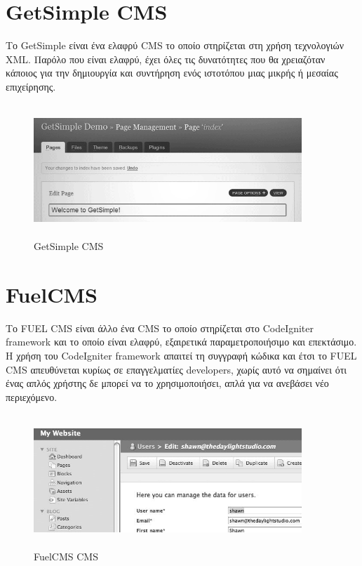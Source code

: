 \documentclass[12pt]{report}
\begin{document}
\section{\textlatin{GetSimple CMS}}
Το \textlatin{GetSimple} είναι ένα ελαφρύ \textlatin{CMS} το οποίο στηρίζεται στη χρήση τεχνολογιών \textlatin{XML}. Παρόλο που είναι ελαφρύ, έχει όλες τις δυνατότητες που θα χρειαζόταν κάποιος για την δημιουργία και συντήρηση ενός ιστοτόπου μιας μικρής ή μεσαίας επιχείρησης.
\begin{figure}[H]
\centering
\includegraphics[width=0.9\textwidth, height=5cm]{getsimplecms-gray}
\caption{\textlatin{GetSimple CMS}}
\label{fig:get_simpl}
\end{figure}

\section{\textlatin{FuelCMS}}
Το \textlatin{FUEL CMS} είναι άλλο ένα \textlatin{CMS} το οποίο στηρίζεται στο \textlatin{CodeIgniter framework} και το οποίο είναι ελαφρύ, εξαιρετικά παραμετροποιήσιμο και επεκτάσιμο. Η χρήση του \textlatin{CodeIgniter framework} απαιτεί τη συγγραφή κώδικα και έτσι το \textlatin{FUEL CMS} απευθύνεται κυρίως σε επαγγελματίες \textlatin{developers}, χωρίς αυτό να σημαίνει ότι ένας απλός χρήστης δε μπορεί να το χρησιμοποιήσει, απλά για να ανεβάσει νέο περιεχόμενο.
\begin{figure}[H]
\centering
\includegraphics[width=0.9\textwidth, height=5cm]{fuelcms-gray}
\caption{\textlatin{FuelCMS CMS}}
\label{fig:fuelcms}
\end{figure}
\end{document}

